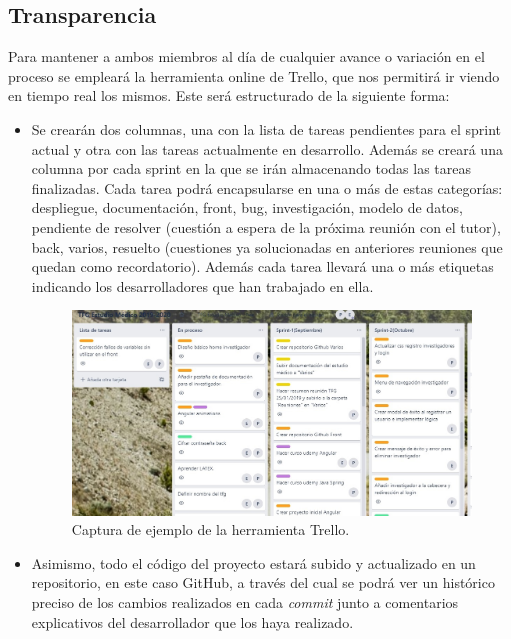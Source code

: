    \subsection{Transparencia}
    Para mantener a ambos miembros al día de cualquier avance o variación en el proceso se empleará la herramienta online de Trello\cite{Trello}, que nos permitirá ir viendo en tiempo real los mismos. Este será estructurado de la siguiente forma:
    
    \begin{itemize}
    \item Se crearán dos columnas, una con la lista de tareas pendientes para el sprint actual y otra con las tareas actualmente en desarrollo. Además se creará una columna por cada sprint en la que se irán almacenando todas las tareas finalizadas. Cada tarea podrá encapsularse en una o más de estas categorías: despliegue, documentación, front, bug, investigación, modelo de datos, pendiente de resolver (cuestión a espera de la próxima reunión con el tutor), back, varios, resuelto (cuestiones ya solucionadas en anteriores reuniones que quedan como recordatorio). Además cada tarea llevará una o más etiquetas indicando los desarrolladores que han trabajado en ella.\newline
    
     \begin{figure}[h]
    \centering
     \includegraphics[width=1\textwidth]{images/Trello.jpg}
    \caption{Captura de ejemplo de la herramienta Trello.}
    \end{figure}
    \newpage
    
    \item  Asimismo, todo el código del proyecto estará subido y actualizado en un repositorio, en este caso GitHub\cite{github}, a través del cual se podrá ver un histórico preciso de los cambios realizados en cada \textit{commit} junto a comentarios explicativos del desarrollador que los haya realizado.\newline
    

\end{itemize}
